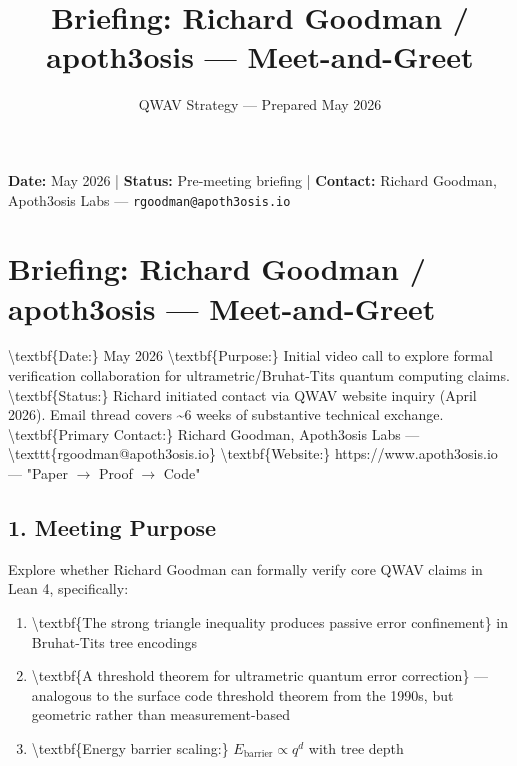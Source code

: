\documentclass[11pt,a4paper]{article}
\title{Briefing: Richard Goodman / apoth3osis — Meet-and-Greet}
\author{QWAV Strategy — Prepared May 2026}
\date{}
\begin{document}
\maketitle

\vspace{-2em}
\begin{center}
\small
\textbf{Date:} May 2026 \quad|\quad
\textbf{Status:} Pre-meeting briefing \quad|\quad
\textbf{Contact:} Richard Goodman, Apoth3osis Labs — \texttt{rgoodman@apoth3osis.io}
\end{center}

\hrulefill

\section{Briefing: Richard Goodman / apoth3osis --- Meet-and-Greet}


\textbackslash{}textbf\{Date:\} May 2026
\textbackslash{}textbf\{Purpose:\} Initial video call to explore formal verification collaboration for ultrametric/Bruhat-Tits quantum computing claims.
\textbackslash{}textbf\{Status:\} Richard initiated contact via QWAV website inquiry (April 2026). Email thread covers \textasciitilde{}6 weeks of substantive technical exchange.
\textbackslash{}textbf\{Primary Contact:\} Richard Goodman, Apoth3osis Labs --- \textbackslash{}texttt\{rgoodman@apoth3osis.io\}
\textbackslash{}textbf\{Website:\} https://www.apoth3osis.io --- "Paper $\to$ Proof $\to$ Code"

\hrulefill


\subsection{1. Meeting Purpose}


Explore whether Richard Goodman can formally verify core QWAV claims in Lean 4, specifically:

\begin{enumerate}
\item \textbackslash{}textbf\{The strong triangle inequality produces passive error confinement\} in Bruhat-Tits tree encodings
\item \textbackslash{}textbf\{A threshold theorem for ultrametric quantum error correction\}  --- analogous to the surface code threshold theorem from the 1990s, but geometric rather than measurement-based
\item \textbackslash{}textbf\{Energy barrier scaling:\} $E_{\text{barrier}} \propto q^d$ with tree depth
\end{enumerate}
\end{document}
